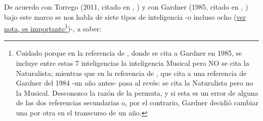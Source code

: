 \documentclass[12pt, a4paper]{article}
\begin{document}
	De acuerdo con Torrego (2011, citado en \citeauthor{reche2019models}, \citeyear{reche2019models}) y con Gardner (1985, citado en \citeauthor{Arocas2002OrientPsicopedGVA}, \citeyear{Arocas2002OrientPsicopedGVA}) bajo este marco se nos habla de siete tipos de inteligencia -o incluso ocho (\underline{ver nota, es importante}\footnote{Cuidado porque en la referencia de \textcite{Arocas2002OrientPsicopedGVA}, donde se cita a Gardner en 1985, se incluye entre estas 7 inteligencias la inteligencia Musical pero NO se cita la Naturalista; mientras que en la referencia de \textcite{reche2019models}, que cita a una referencia de Gardner del 1984 -un año antes- pasa al revés: se cita la Naturalista pero no la Musical. Desconozco la razón de la permuta, y si esta es un error de alguna de las dos referencias secundarias o, por el contrario, Gardner decidió cambiar una por otra en el transcurso de un año.})-, a saber:
	
\end{document}

